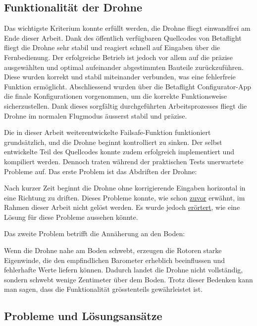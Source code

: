\subsection{Funktionalität der Drohne}
Das wichtigste Kriterium konnte erfüllt werden, die Drohne fliegt einwandfrei am Ende dieser Arbeit. Dank des öffentlich verfügbaren Quellcodes von Betaflight fliegt die Drohne sehr stabil und reagiert schnell auf Eingaben über die Fernbedienung. Der erfolgreiche Betrieb ist jedoch vor allem auf die präzise ausgewählten und optimal aufeinander abgestimmten Bauteile zurückzuführen. Diese wurden korrekt und stabil miteinander verbunden, was eine fehlerfreie Funktion ermöglicht. Abschliessend wurden über die Betaflight Configurator-App die finale Konfigurationen vorgenommen, um die korrekte Funktionsweise sicherzustellen. Dank dieses sorgfältig durchgeführten Arbeitsprozesses fliegt die Drohne im normalen Flugmodus äusserst stabil und präzise. 

Die in dieser Arbeit weiterentwickelte Failsafe-Funktion funktioniert grundsätzlich, und die Drohne beginnt kontrolliert zu sinken. Der selbst entwickelte Teil des Quellcodes konnte zudem erfolgreich implementiert und kompiliert werden. 
Dennoch traten während der praktischen Tests unerwartete Probleme auf. Das erste Problem ist das Abdriften der Drohne: 

Nach kurzer Zeit beginnt die Drohne ohne korrigierende Eingaben horizontal in eine Richtung zu driften. Dieses Probleme konnte, wie schon \hyperref[probleme]{zuvor} erwähnt, im Rahmen dieser Arbeit nicht gelöst werden. Es wurde jedoch \hyperref[sec:ausblick]{erörtert}, wie eine Lösung für diese Probleme aussehen könnte.


Das zweite Problem betrifft die Annäherung an den Boden:

Wenn die Drohne nahe am Boden schwebt, erzeugen die Rotoren starke Eigenwinde, die den empfindlichen Barometer erheblich beeinflussen und fehlerhafte Werte liefern können. Dadurch landet die Drohne nicht vollständig, sondern schwebt wenige Zentimeter über dem Boden. Trotz dieser Bedenken kann man sagen, dass die Funktionalität grösstenteils gewährleistet ist.

\subsection{Probleme und Lösungsansätze}

